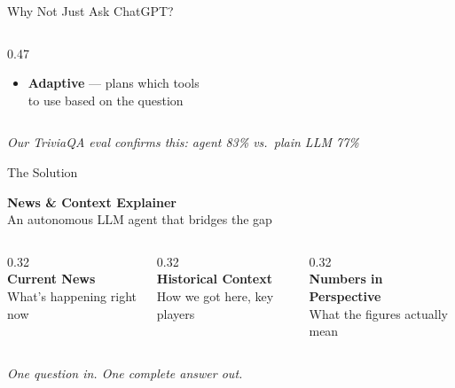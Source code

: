 \documentclass[aspectratio=169]{beamer}
\begin{document}
\begin{frame}{Why Not Just Ask ChatGPT?}
\begin{columns}[T]
\begin{column}{0.47\textwidth}
\begin{itemize}
              traceable source URL
        \item[\textcolor{primary}{$\checkmark$}] \textbf{Adaptive} — plans which tools\\
              to use based on the question
      \end{itemize}
    \end{column}
  \end{columns}
  \vspace{0.5em}
  \begin{center}
    \small\textit{Our TriviaQA eval confirms this: agent 83\% vs.\ plain LLM 77\%}
  \end{center}
\end{frame}

\begin{frame}{The Solution}
  \begin{center}
    {\Large \textbf{News \& Context Explainer}}\\[0.5em]
    {\large An autonomous LLM agent that bridges the gap}
  \end{center}
  \vspace{0.4cm}
  \begin{columns}[T]
    \begin{column}{0.32\textwidth}
      \centering
      \textcolor{primary}{\Large \faSearch}\\[4pt]
      \textbf{Current News}\\[4pt]
      \small What's happening right now
    \end{column}
    \begin{column}{0.32\textwidth}
      \centering
      \textcolor{primary}{\Large \faBook}\\[4pt]
      \textbf{Historical Context}\\[4pt]
      \small How we got here, key players
    \end{column}
    \begin{column}{0.32\textwidth}
      \centering
      \textcolor{primary}{\Large \faCalculator}\\[4pt]
      \textbf{Numbers in Perspective}\\[4pt]
      \small What the figures actually mean
    \end{column}
  \end{columns}
  \vspace{0.6cm}
  \begin{center}
    \textit{One question in. One complete answer out.}
  \end{center}
\end{frame}
\end{document}
